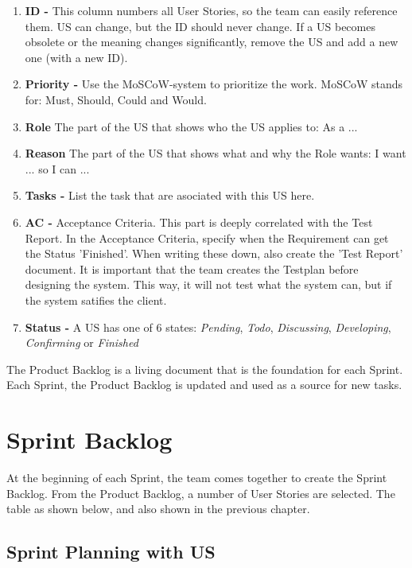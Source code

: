 \documentclass[10pt]{report}
\begin{document}
\begin{enumerate}
	\item \textbf{ID -} This column numbers all User Stories, so the team can easily reference them. US can change, but the ID should never change. If a US becomes obsolete or the meaning changes significantly, remove the US and add a new one (with a new ID).
	\item \textbf{Priority -} Use the MoSCoW-system to prioritize the work. MoSCoW stands for: Must, Should, Could and Would.
	\item \textbf{Role} The part of the US that shows who the US applies to: As a ...
	\item \textbf{Reason} The part of the US that shows what and why the Role wants: I want ... so I can ...
	\item \textbf{Tasks -} List the task that are asociated with this US here.
	\item \textbf{AC -} Acceptance Criteria. This part is deeply correlated with the Test Report. In the Acceptance Criteria, specify when the Requirement can get the Status 'Finished'. When writing these down, also create the 'Test Report' document. It is important that the team creates the Testplan before designing the system. This way, it will not test what the system can, but if the system satifies the client.
	\item \textbf{Status -} A US has one of 6 states: 
		\emph{Pending}, \emph{Todo}, \emph{Discussing}, \emph{Developing}, \emph{Confirming} or \emph{Finished}
\end{enumerate}

The Product Backlog is a living document that is the foundation for each Sprint. Each Sprint, the Product Backlog is updated and used as a source for new tasks.

\newpage

\section{Sprint Backlog}

At the beginning of each Sprint, the team comes together to create the Sprint Backlog. From the Product Backlog, a number of User Stories are selected. The table as shown below, and also shown in the previous chapter.

\subsection{Sprint Planning with US}
\end{document}
